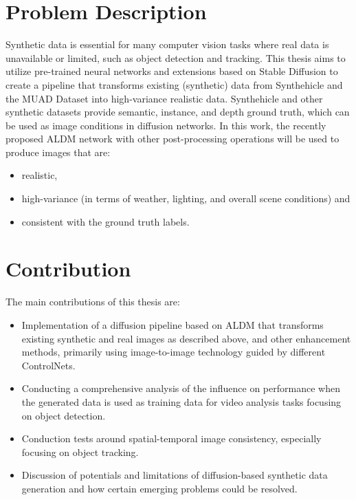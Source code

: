 \section{Problem Description}
\label{sec:prob_description}
Synthetic data is essential for many computer vision tasks where real data is unavailable or limited, such as object detection and tracking. This thesis aims to utilize pre-trained neural networks and extensions based on Stable Diffusion \cite{rombach2022highresolution} to create a pipeline that transforms existing (synthetic) data from Synthehicle \cite{Herzog_2023_WACV} and the MUAD Dataset \cite{Franchi2022MUAD} into high-variance realistic data. Synthehicle and other synthetic datasets provide semantic, instance, and depth ground truth, which can be used as image conditions in diffusion networks. In this work, the recently proposed ALDM \cite{li2024aldm} network with other post-processing operations will be used to produce images that are: 
\begin{itemize}
    \item realistic, 
    \item high-variance (in terms of weather, lighting, and overall scene conditions) and 
    \item consistent with the ground truth labels. 
\end{itemize}

\section{Contribution} 
The main contributions of this thesis are:
\begin{itemize}
    \item Implementation of a diffusion pipeline based on ALDM \cite{li2024aldm} that transforms existing
synthetic and real images as described above, and other enhancement methods, primarily using image-to-image technology guided by different ControlNets.
    \item Conducting a comprehensive analysis of the influence on performance when the generated data
is used as training data for video analysis tasks focusing on object detection.
    \item Conduction tests around spatial-temporal image consistency, especially focusing on object tracking.
    \item Discussion of potentials and limitations of diffusion-based synthetic data generation and how
certain emerging problems could be resolved.
\end{itemize}

